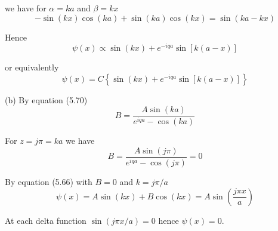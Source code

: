 we have for $\alpha=ka$ and $\beta=kx$
\begin{equation*}
-\sin(kx)\cos(ka)+\sin(ka)\cos(kx)=\sin(ka-kx)
\end{equation*}

Hence
\begin{equation*}
\psi(x)\propto\sin(kx)+e^{-iqa}\sin[k(a-x)]
\end{equation*}

or equivalently
\begin{equation*}
\psi(x)=C\left\{\sin(kx)+e^{-iqa}\sin[k(a-x)]\right\}
\end{equation*}

(b) By equation (5.70)
\begin{equation*}
B=\frac{A\sin(ka)}{e^{iqa}-\cos(ka)}
\end{equation*}

For $z=j\pi=ka$ we have
\begin{equation*}
B=\frac{A\sin(j\pi)}{e^{iqa}-\cos(j\pi)}=0
\end{equation*}

By equation (5.66) with $B=0$ and $k=j\pi/a$
\begin{equation*}
\psi(x)=A\sin(kx)+B\cos(kx)=A\sin\left(\frac{j\pi x}{a}\right)
\end{equation*}

At each delta function $\sin(j\pi x/a)=0$ hence $\psi(x)=0$.


